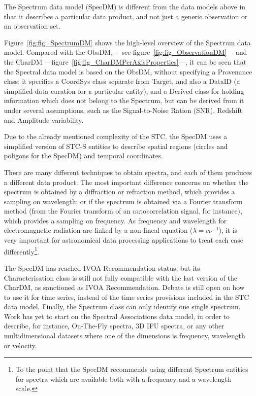 			The Spectrum data model (SpecDM) is different from the
			data models above in that it describes a particular
			data product, and not just a generic observation or an
			observation set.
			
			 Figure~\ref{fig:fig_SpectrumDM} shows the high-level
			overview of the Spectrum data model. Compared with the
			ObsDM, ---see fig\-ure~\ref{fig:fig_ObservationDM}--- and
			the CharDM
			---fig\-ure~\ref{fig:fig_CharDMPerAxisProperties}---,
			it can be
			seen that the Spectral data model is based on the
			ObsDM, without specifying a Provenance class; it
			specifies a CoordSys class separate from Target, and
			also a DataID (a simplified data curation for a
			particular entity); and a Derived class for holding
			information which does not belong to the Spectrum, but
			can be derived from it under several assumptions, such
			as the Signal-to-Noise Ration (SNR), Redshift and
			Amplitude variability.
			
			 Due to the already mentioned complexity of the STC,
			the SpecDM uses a simplified version of STC-S entities
			to describe spatial regions (circles and poligons for
			the SpecDM) and temporal coordinates.
			
			 There are many different techniques to obtain spectra,
			and each of them produces a different data product.
			The most important difference concerns on whether the
			spectrum is obtained by a diffraction or refraction
			method, which provides a sampling on wavelength; or if
			the spectrum is obtained via a Fourier transform
			method (from the Fourier transform of an autocorrelation
			signal, for instance), which provides a sampling on
			frequency. As frequency and wavelength for
			electromagnetic radiation are linked by a non-lineal 
			equation ($\lambda = c\nu^{-1}$), it is very important
			for astronomical data processing applications to
			treat each case differently\footnote{To the point that
			the SpecDM recommends using different Spectrum entities
			for spectra which are available both with a frequency
			and a wavelength scale.}.
			
			 The SpecDM has reached IVOA Recommendation status, but
			its Characterisation class is still not fully
			compatible with the last version of the CharDM, as
			sanctioned as IVOA Recommendation. Debate is still
			open on how to use it for time series, instead of the
			time series provisions included in the STC data model.
			Finally, the Spectrum class can only identify one
			single spectrum. Work has yet to start on the
			Spectral Associations data model, in order to describe,
			for instance, On-The-Fly spectra, 3D IFU spectra, or
			any other multidimensional datasets where one of the
			dimensions is frequency, wavelength or velocity.
			
